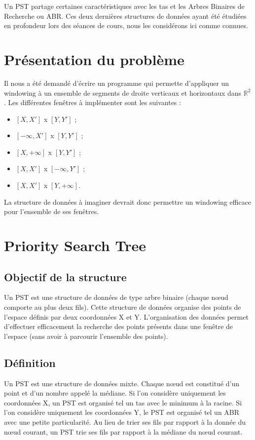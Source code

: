 \documentclass[10pt,a4paper]{article}
\begin{document}
Un PST partage certaines caractéristiques avec les tas et les Arbres Binaires de Recherche ou ABR. Ces deux dernières structures de données ayant été étudiées en profondeur lors des séances de cours, nous les considérons ici comme connues.

\section{Présentation du problème}
Il nous a été demandé d'écrire un programme qui permette d'appliquer un windowing à un ensemble de segments de droite verticaux et horizontaux dans $\mathbb{R}^2$. Les différentes fenêtres à implémenter sont les suivantes :
\begin{itemize}
	\item $[X, X']$ x $[Y, Y']$ ;
	\item $[-\infty, X']$ x $[Y, Y']$ ;
	\item $[X, +\infty]$ x $[Y, Y']$ ;
	\item $[X, X']$ x $[-\infty, Y']$ ;
	\item $[X, X']$ x $[Y, +\infty]$.
\end{itemize}
La structure de données à imaginer devrait donc permettre un windowing efficace pour l'ensemble de ses fenêtres.


\newpage
\section{Priority Search Tree}

\subsection{Objectif de la structure}
Un PST est une structure de données de type arbre binaire (chaque nœud comporte au plus deux fils). Cette structure de données organise des points de l'espace définis par deux coordonnées X et Y. L'organisation des données permet d'effectuer efficacement la recherche des points présents dans une fenêtre de l'espace (sans avoir à parcourir l'ensemble des points).

\subsection{Définition}
Un PST est une structure de données mixte. Chaque nœud est constitué d'un point et d'un nombre appelé la médiane. Si l'on considère uniquement les coordonnées X, un PST est organisé tel un tas avec le minimum à la racine. Si l'on considère uniquement les coordonnées Y, le PST est organisé tel un ABR avec une petite particularité. Au lieu de trier ses fils par rapport à la donnée du nœud courant, un PST trie ses fils par rapport à la médiane du nœud courant.
\end{document}
